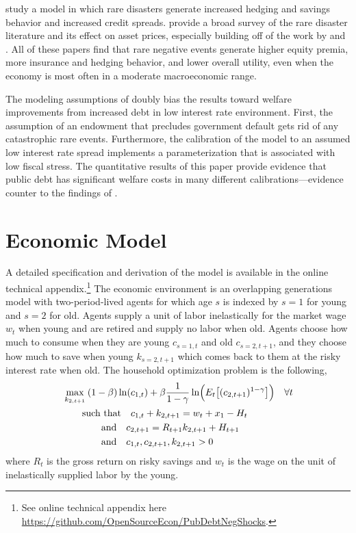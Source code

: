 \documentclass[letterpaper,12pt]{article}
\theoremstyle{definition}
\begin{document}
  \citet{RebeloEtAl:2019} study a model in which rare disasters generate increased hedging and savings behavior and increased credit spreads. \citet{TsaiWachter:2015} provide a broad survey of the rare disaster literature and its effect on asset prices, especially building off of the work by \citet{Gourio:2012} and \citet{Barro:2009}. All of these papers find that rare negative events generate higher equity premia, more insurance and hedging behavior, and lower overall utility, even when the economy is most often in a moderate macroeconomic range.

  The modeling assumptions of \citet{Blanchard:2019} doubly bias the results toward welfare improvements from increased debt in low interest rate environment. First, the assumption of an endowment that precludes government default gets rid of any catastrophic rare events. Furthermore, the calibration of the model to an assumed low interest rate spread implements a parameterization that is associated with low fiscal stress. The quantitative results of this paper provide evidence that public debt has significant welfare costs in many different calibrations---evidence counter to the findings of \citet{Blanchard:2019}.


\section{Economic Model}\label{SecModel}

  A detailed specification and derivation of the model is available in the online technical appendix.\footnote{See online technical appendix here \href{https://github.com/OpenSourceEcon/PubDebtNegShocks}{https://github.com/OpenSourceEcon/PubDebtNegShocks}.} The economic environment is an overlapping generations model with two-period-lived agents for which age $s$ is indexed by $s=1$ for young and $s=2$ for old. Agents supply a unit of labor inelastically for the market wage $w_t$ when young and are retired and supply no labor when old. Agents choose how much to consume when they are young $c_{s=1,t}$ and old $c_{s=2,t+1}$, and they choose how much to save when young $k_{s=2,t+1}$ which comes back to them at the risky interest rate when old. The household optimization problem is the following,
  \begin{align}
    &\max_{k_{2,t+1}}\: (1-\beta)\ln(c_{1,t}) + \beta\frac{1}{1-\gamma}\ln\Bigl(E_t\bigl[(c_{2,t+1})^{1-\gamma}\bigr]\Bigr) \quad \forall t \label{EqHH_maxUtil} \\
    &\qquad\text{such that}\quad c_{1,t} + k_{2,t+1} = w_t + x_1 - H_t \label{EqHH_bc1} \\
    &\qquad\qquad\text{and}\quad c_{2,t+1} = R_{t+1}k_{2,t+1} + H_{t+1} \label{EqHH_bc2} \\
    &\qquad\qquad\text{and}\quad c_{1,t},c_{2,t+1},k_{2,t+1} > 0 \label{EqHH_nonneg}
  \end{align}
  where $R_t$ is the gross return on risky savings and $w_t$ is the wage on the unit of inelastically supplied labor by the young.
\end{document}
